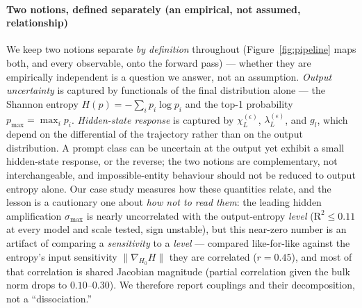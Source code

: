 \documentclass{article}
\begin{document}
\paragraph{Two notions, defined separately (an empirical, not assumed, relationship)}
We keep two notions separate \emph{by definition} throughout (Figure~\ref{fig:pipeline} maps both, and
every observable, onto the forward pass) --- whether they are empirically
independent is a question we answer, not an assumption. \emph{Output uncertainty} is captured by functionals
of the final distribution alone --- the Shannon entropy $H(p)=-\sum_i p_i\log p_i$ and the top-1
probability $p_{\max}=\max_i p_i$. \emph{Hidden-state response} is captured by
$\chi_L^{(\epsilon)}$, $\lambda_L^{(\epsilon)}$, and $g_l$, which depend on the differential of
the trajectory rather than on the output distribution. A prompt class can be uncertain at the
output yet exhibit a small hidden-state response, or the reverse; the two notions are
complementary, not interchangeable, and impossible-entity behaviour should not be reduced to
output entropy alone. Our case study measures how these quantities relate, and the lesson is a
cautionary one about \emph{how not to read them}: the leading hidden amplification $\sigma_{\max}$ is
nearly uncorrelated with the output-entropy \emph{level} ($\mathrm{R}^2\le0.11$ at every model and scale tested, sign unstable), but this near-zero number is
an artifact of comparing a \emph{sensitivity} to a \emph{level} --- compared like-for-like against
the entropy's input sensitivity $\|\nabla_{H_0}H\|$ they are correlated ($r=0.45$), and most of that
correlation is shared Jacobian magnitude (partial correlation given the bulk norm drops to
$0.10$--$0.30$). We therefore report couplings and their decomposition, not a ``dissociation.''
\end{document}
